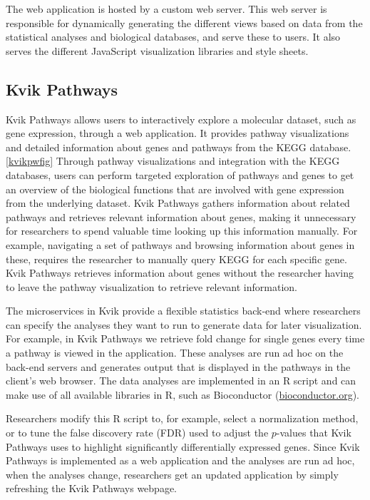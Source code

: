 The web application is hosted by a custom web server. This web server is
responsible for dynamically generating the different views based on data from
the statistical analyses and biological databases, and serve these to users. It
also serves the different JavaScript visualization libraries and style sheets. 

\subsection{Kvik Pathways}
Kvik Pathways allows users to interactively explore a molecular dataset,
such as gene expression, through a web application. It provides pathway
visualizations and detailed information about genes and pathways from the
KEGG database. \ref{kvikpwfig} Through pathway visualizations and integration
with the KEGG databases, users can perform targeted exploration of
pathways and genes to get an overview of the biological functions that are
involved with gene expression from the underlying dataset. Kvik Pathways gathers
information about related pathways and retrieves relevant information about
genes, making it unnecessary for researchers to spend valuable time looking up
this information manually. For example, navigating a set of pathways and
browsing information about genes in these, requires the researcher to manually
query KEGG for each specific gene.  Kvik Pathways retrieves information about
genes without the researcher having to leave the pathway visualization to
retrieve relevant information. 

The microservices in Kvik provide a flexible statistics back-end where
researchers can specify the analyses they want to run to generate data for later
visualization. For example, in Kvik Pathways we retrieve fold change for single
genes every time a pathway is viewed in the application.  These analyses are run
ad hoc on the back-end servers and generates output that is displayed in the
pathways in the client's web browser. The data analyses are implemented in an R
script and can make use of all available libraries in R, such as Bioconductor
(\href{bioconductor.org}{bioconductor.org}). 

Researchers modify this R script to, for example, select a normalization method,
or to tune the false discovery rate (FDR) used to adjust the $p$-values that
Kvik Pathways uses to highlight significantly differentially expressed genes.
Since Kvik Pathways is implemented as a web application and the analyses are run
ad hoc, when the analyses change, researchers get an updated application by
simply refreshing the Kvik Pathways webpage. 



